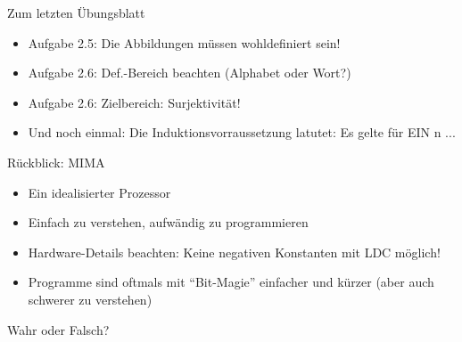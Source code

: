 \newcommand{\mydate}{09.12.2016}

\newcommand{\handout}{}




\graphicspath{{../figures/}}




\begin{frame}{Zum letzten Übungsblatt}
	\begin{itemize}[<+->]
		\item Aufgabe 2.5: Die Abbildungen müssen wohldefiniert sein!
		\item Aufgabe 2.6: Def.-Bereich beachten (Alphabet oder Wort?)
		\item Aufgabe 2.6: Zielbereich: Surjektivität!
		\item Und noch einmal: Die Induktionsvorraussetzung latutet: Es gelte für EIN n ...
	\end{itemize}
\end{frame}

\framePrevEpisode

\begin{frame}{Rückblick: MIMA}
	\begin{itemize}[<+->]
		\item Ein idealisierter Prozessor
		\item Einfach zu verstehen, aufwändig zu programmieren
		\item Hardware-Details beachten: Keine negativen Konstanten mit LDC möglich!
		\item Programme sind oftmals mit \enquote{Bit-Magie} einfacher und kürzer (aber auch schwerer zu verstehen)
	\end{itemize}
\end{frame}

\begin{frame}{Wahr oder Falsch?}
	\begin{block}{}
	\begin{itemize}
	\end{itemize}
	\end{block}
\end{frame}

